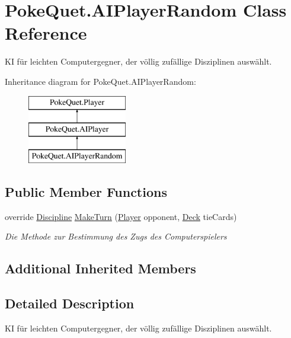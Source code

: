 \hypertarget{class_poke_quet_1_1_a_i_player_random}{}\section{Poke\+Quet.\+A\+I\+Player\+Random Class Reference}
\label{class_poke_quet_1_1_a_i_player_random}


KI für leichten Computergegner, der völlig zufällige Disziplinen auswählt.  


Inheritance diagram for Poke\+Quet.\+A\+I\+Player\+Random\+:\begin{figure}[H]
\begin{center}
\leavevmode
\includegraphics[height=3.000000cm]{class_poke_quet_1_1_a_i_player_random}
\end{center}
\end{figure}
\subsection*{Public Member Functions}
\begin{DoxyCompactItemize}
\item 
override \mbox{\hyperlink{namespace_poke_quet_aa425f1b8cf90847021fe1177d6a7199d}{Discipline}} \mbox{\hyperlink{class_poke_quet_1_1_a_i_player_random_a8723ee791e3ac1ea34033cd6ce49398f}{Make\+Turn}} (\mbox{\hyperlink{class_poke_quet_1_1_player}{Player}} opponent, \mbox{\hyperlink{class_poke_quet_1_1_deck}{Deck}} tie\+Cards)
\begin{DoxyCompactList}\small\item\em Die Methode zur Bestimmung des Zugs des Computerspielers \end{DoxyCompactList}\end{DoxyCompactItemize}
\subsection*{Additional Inherited Members}


\subsection{Detailed Description}
KI für leichten Computergegner, der völlig zufällige Disziplinen auswählt. 




